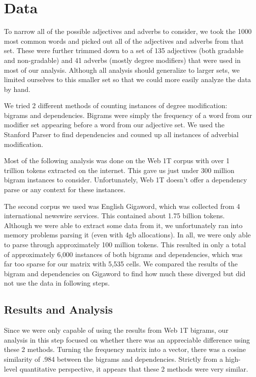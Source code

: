 \documentclass[11pt]{amsart}
\begin{document}
\section{Data}
To narrow all of the possible adjectives and adverbs to consider, we took the 1000 most common words and picked out all of the adjectives and adverbs from that set. These were further trimmed down to a set of 135 adjectives (both gradable and non-gradable) and 41 adverbs (mostly degree modifiers) that were used in most of our analysis. Although all analysis should generalize to larger sets, we limited ourselves to this smaller set so that we could more easily analyze the data by hand.

We tried 2 different methods of counting instances of degree modification: bigrams and dependencies. Bigrams were simply the frequency of a word from our modifier set appearing before a word from our adjective set. We used the Stanford Parser\cite{marneffe} to find dependencies and couned up all instances of adverbial modification.

Most of the following analysis was done on the Web 1T corpus with over 1 trillion tokens extracted on the internet. This gave us just under 300 million bigram instances to consider. Unfortunately, Web 1T doesn't offer a dependency parse or any context for these instances.

The second corpus we used was English Gigaword, which was collected from 4 international newswire services. This contained about 1.75 billion tokens. Although we were able to extract some data from it, we unfortunately ran into memory problems parsing it (even with 4gb allocations). In all, we were only able to parse through approximately 100 million tokens. This resulted in only a total of approximately 6,000 instances of both bigrams and dependencies, which was far too sparse for our matrix with 5,535 cells. We compared the results of the bigram and dependencies on Gigaword to find how much these diverged but did not use the data in following steps.

\subsection{Results and Analysis}
Since we were only capable of using the results from Web 1T bigrams, our analysis in this step focused on whether there was an appreciable difference using these 2 methods. Turning the frequency matrix into a vector, there was a cosine similarity of .984 between the bigrams and dependencies. Strictly from a high-level quantitative perspective, it appears that these 2 methods were very similar.
\end{document}
